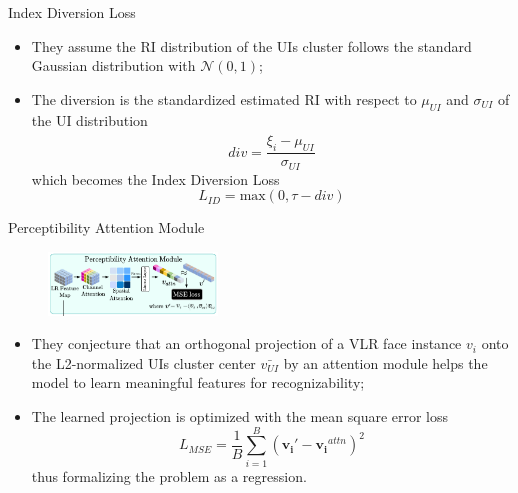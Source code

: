 \documentclass[aspectratio=169,xcolor=dvipsnames]{beamer}
\begin{document}
\begin{frame}{Index Diversion Loss}
   \begin{itemize}
    \item They assume the RI distribution of the UIs cluster follows the standard Gaussian distribution with $\mathcal{N}(0, 1)$;
    \item The diversion is the standardized estimated RI with respect to $\mu_{UI}$ and $\sigma_{UI}$ of the UI distribution $$div = \frac{\hat{\xi_i} - \mu_{UI}}{\sigma_{UI}}$$
    which becomes the Index Diversion Loss $$L_{ID} = \text{max}(0, \tau - div)$$
   \end{itemize} 
\end{frame}

\begin{frame}{Perceptibility Attention Module}
    \begin{figure}
        \centering
        \includegraphics[width=0.4\textwidth]{imgs/11_Fig_2_2_PAM.png}
        \label{fig:f2-2-pam}
    \end{figure}
    \begin{itemize}
        \item They conjecture that an orthogonal projection of a VLR face instance $v_i$ onto the L2-normalized UIs cluster center $\bar{v_{UI}}$ by an attention module helps the model to learn meaningful features for recognizability;
        \item The learned projection is optimized with the mean square error loss
        $$L_{MSE} = \frac{1}{B} \sum_{i=1}^B (\mathbf{v_i'} - \mathbf{v_i}^{attn})^2$$
        thus formalizing the problem as a regression.
    \end{itemize}
\end{frame}
\end{document}
